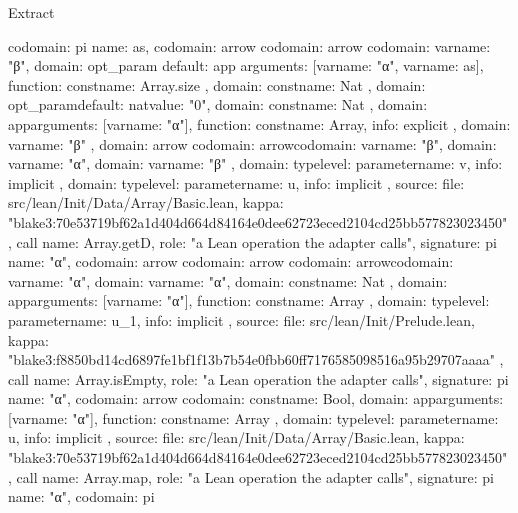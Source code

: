 \begin{lexlean}{Extract}
\begin{toolingmodule}
{{{{{{              codomain: pi{
                name: as,
                codomain: arrow{
                  codomain: arrow{
                    codomain: var{name: "β"},
                    domain: opt_param{
                      default: app{
                        arguments: [var{name: "α"}, var{name: as}],
                        function: const{name: Array.size}
                      },
                      domain: const{name: Nat}
                    }
                  },
                  domain: opt_param{default: nat{value: "0"}, domain: const{name: Nat}}
                },
                domain: app{arguments: [var{name: "α"}], function: const{name: Array}},
                info: explicit
              },
              domain: var{name: "β"}
            },
            domain: arrow{
              codomain: arrow{codomain: var{name: "β"}, domain: var{name: "α"}},
              domain: var{name: "β"}
            }
          },
          domain: type{level: parameter{name: v}},
          info: implicit
        },
        domain: type{level: parameter{name: u}},
        info: implicit
      },
      source: {
        file: src/lean/Init/Data/Array/Basic.lean,
        kappa: "blake3:70e53719bf62a1d404d664d84164e0dee62723eced2104cd25bb577823023450"
      }
    },
    call{
      name: Array.getD,
      role: "a Lean operation the adapter calls",
      signature: pi{
        name: "α",
        codomain: arrow{
          codomain: arrow{
            codomain: arrow{codomain: var{name: "α"}, domain: var{name: "α"}},
            domain: const{name: Nat}
          },
          domain: app{arguments: [var{name: "α"}], function: const{name: Array}}
        },
        domain: type{level: parameter{name: u_1}},
        info: implicit
      },
      source: {
        file: src/lean/Init/Prelude.lean,
        kappa: "blake3:f8850bd14cd6897fe1bf1f13b7b54e0fbb60ff7176585098516a95b29707aaaa"
      }
    },
    call{
      name: Array.isEmpty,
      role: "a Lean operation the adapter calls",
      signature: pi{
        name: "α",
        codomain: arrow{
          codomain: const{name: Bool},
          domain: app{arguments: [var{name: "α"}], function: const{name: Array}}
        },
        domain: type{level: parameter{name: u}},
        info: implicit
      },
      source: {
        file: src/lean/Init/Data/Array/Basic.lean,
        kappa: "blake3:70e53719bf62a1d404d664d84164e0dee62723eced2104cd25bb577823023450"
      }
    },
    call{
      name: Array.map,
      role: "a Lean operation the adapter calls",
      signature: pi{
        name: "α",
        codomain: pi{
}}}}
\end{toolingmodule}
\end{lexlean}
